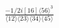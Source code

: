 \documentclass[varwidth, border=5pt]{standalone}
\begin{document}
\begin{my}
$\begin{gathered}
\scriptscriptstyle\frac{-1/2i[16]\langle56\rangle^3}{\langle12\rangle\langle23\rangle\langle34\rangle\langle45\rangle}
\end{gathered}$
\end{my}
\end{document}
